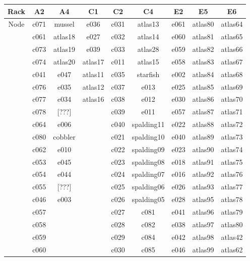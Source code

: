 \documentclass[10pt,letterpaper]{article}
\begin{document}
        \begin{center}
        \begin{tabular}{ |c|c|c|c|c|c|c|c|c| }
        \hline
        Rack & A2 & A4 & C1 & C2 & C4 & E2 & E5 & E6 \\
        \hline
        \multirow{1}{3em}{Node}

        & c071 & mussel  & e036    & c031 & atlas13    & e061 & atlas80 & atlas64 \\
        & c061 & atlas18 & e027    & c032 & atlas14    & e060 & atlas81 & atlas65 \\
        & c073 & atlas19 & e039    & c033 & atlas28    & e059 & atlas82 & atlas66 \\
        & c074 & atlas20 & atlas17 & c011 & atlas15    & e058 & atlas83 & atlas67 \\
        & c041 & e047    & atlas11 & c035 & starfish   & e002 & atlas84 & atlas68 \\
        & c076 & e035    & atlas12 & c037 & e013       & e025 & atlas85 & atlas69 \\
        & c077 & e034    & atlas16 & c038 & e012       & e030 & atlas86 & atlas70 \\
        & c078 & [???]   &         & c039 & e011       & e057 & atlas87 & atlas71 \\
        & c064 & e006    &         & c040 & spalding11 & e022 & atlas88 & atlas72 \\
        & c080 & cobbler &         & c021 & spalding10 & e040 & atlas89 & atlas73 \\
        & c062 & e010    &         & c022 & spalding09 & e023 & atlas90 & atlas74 \\
        & c053 & e045    &         & c023 & spalding08 & e018 & atlas91 & atlas75 \\
        & c054 & e044    &         & c024 & spalding07 & e016 & atlas92 & atlas76 \\
        & c055 & [???]   &         & c025 & spalding06 & e026 & atlas93 & atlas77 \\
        & c046 & e003    &         & c026 & spalding05 & e028 & atlas95 & atlas78 \\
        & c057 &         &         & c027 & c081       & e041 & atlas96 & atlas79 \\
        & c058 &         &         & c028 & c082       & e038 & atlas97 & atlas80 \\
        & c059 &         &         & c029 & c084       & e042 & atlas98 & atlas42 \\
        & c060 &         &         & c030 & c085       & e046 & atlas99 & atlas62 \\

\end{tabular}
\end{center}
\end{document}

